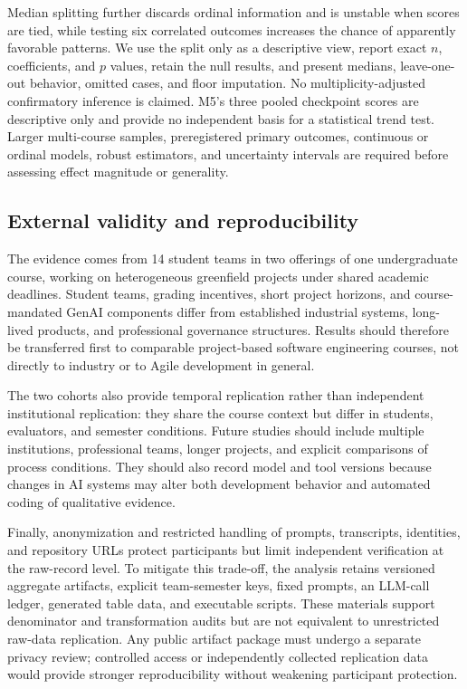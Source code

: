 \documentclass[conference]{IEEEtran}
\begin{document}
Median splitting further discards ordinal information and is unstable when
scores are tied, while testing six correlated outcomes increases the chance of
apparently favorable patterns. We use the split only as a descriptive view,
report exact $n$, coefficients, and $p$ values, retain the null results, and
present medians, leave-one-out behavior, omitted cases, and floor imputation.
No multiplicity-adjusted confirmatory inference is claimed. M5's three pooled
checkpoint scores are descriptive only and provide no independent basis for a
statistical trend test. Larger multi-course samples, preregistered primary
outcomes, continuous or ordinal models, robust estimators, and uncertainty
intervals are required before assessing effect magnitude or generality.

\subsection{External validity and reproducibility}

The evidence comes from 14 student teams in two offerings of one undergraduate
course, working on heterogeneous greenfield projects under shared academic
deadlines. Student teams, grading incentives, short project horizons, and
course-mandated GenAI components differ from established industrial systems,
long-lived products, and professional governance structures. Results should
therefore be transferred first to comparable project-based software engineering
courses, not directly to industry or to Agile development in general.

The two cohorts also provide temporal replication rather than independent
institutional replication: they share the course context but differ in students,
evaluators, and semester conditions. Future studies should include multiple
institutions, professional teams, longer projects, and explicit comparisons of
process conditions. They should also record model and tool versions because
changes in AI systems may alter both development behavior and automated coding
of qualitative evidence.

Finally, anonymization and restricted handling of prompts, transcripts,
identities, and repository URLs protect participants but limit independent
verification at the raw-record level. To mitigate this trade-off, the analysis
retains versioned aggregate artifacts, explicit team-semester keys, fixed
prompts, an LLM-call ledger, generated table data, and executable scripts.
These materials support denominator and transformation audits but are not
equivalent to unrestricted raw-data replication. Any public artifact package
must undergo a separate privacy review; controlled access or independently
collected replication data would provide stronger reproducibility without
weakening participant protection.
\end{document}
